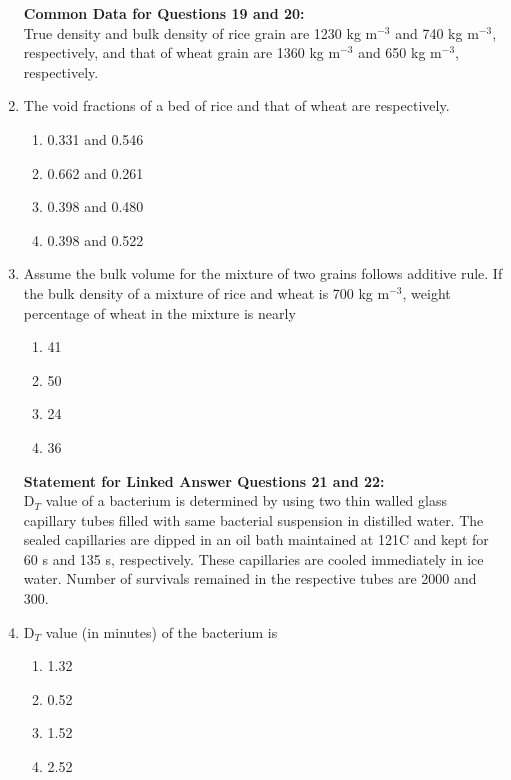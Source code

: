 \documentclass[a4paper,10pt]{article}
\begin{document}
\begin{enumerate}
\textbf{Common Data for Questions 19 and 20:} \\
True density and bulk density of rice grain are 1230 kg m$^{-3}$ and 740 kg m$^{-3}$, respectively, and that of wheat grain are 1360 kg m$^{-3}$ and 650 kg m$^{-3}$, respectively.

\item The void fractions of a bed of rice and that of wheat are respectively.
\hfill{}

\begin{multicols}{4}
\begin{enumerate}
\item 0.331 and 0.546
\item 0.662 and 0.261
\item 0.398 and 0.480
\item 0.398 and 0.522
\end{enumerate}
\end{multicols}

\item Assume the bulk volume for the mixture of two grains follows additive rule. If the bulk density of a mixture of rice and wheat is 700 kg m$^{-3}$, weight percentage of wheat in the mixture is nearly
\hfill{}

\begin{multicols}{4}
\begin{enumerate}
\item 41
\item 50
\item 24
\item 36
\end{enumerate}
\end{multicols}

\textbf{Statement for Linked Answer Questions 21 and 22:} \\
D$_T$ value of a bacterium is determined by using two thin walled glass capillary tubes filled with same bacterial suspension in distilled water. The sealed capillaries are dipped in an oil bath maintained at 121\degree C and kept for 60 s and 135 s, respectively. These capillaries are cooled immediately in ice water. Number of survivals remained in the respective tubes are 2000 and 300.

\item D$_T$ value (in minutes) of the bacterium is
\hfill{}

\begin{multicols}{4}
\begin{enumerate}
\item 1.32
\item 0.52
\item 1.52
\item 2.52
\end{enumerate}
\end{multicols}


\end{enumerate}
\end{document}
